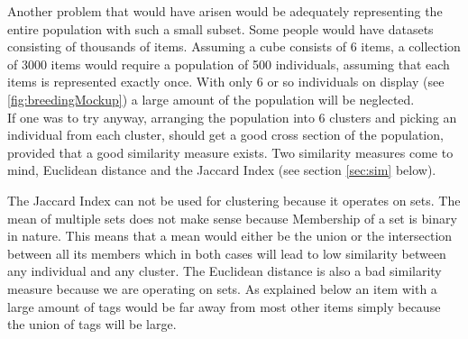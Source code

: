 \documentclass[]{article}
\begin{document}
Another problem that would have arisen would be adequately representing the entire population with such a small subset. Some people would have datasets consisting of thousands of items. Assuming a cube consists of 6 items, a collection of 3000 items would require a population of 500 individuals, assuming that each items is represented exactly once. With only 6 or so individuals on display (see \autoref{fig:breedingMockup}) a large amount of the population will be neglected.\\
If one was to try anyway, arranging the population into 6 clusters and picking an individual from each cluster, should get a good cross section of the population, provided that a good similarity measure exists. Two similarity measures come to mind, Euclidean distance and the Jaccard Index (see section \ref{sec:sim} below).

The Jaccard Index can not be used for clustering because it operates on sets. The mean of multiple sets does not make sense because Membership of a set is binary in nature. This means that a mean would either be the union or the intersection between all its members which in both cases will lead to low similarity between any individual and any cluster.
The Euclidean distance is also a bad similarity measure because we are operating on sets. As explained below an item with a large amount of tags would be far away from most other items simply because the union of tags will be large.
\end{document}
